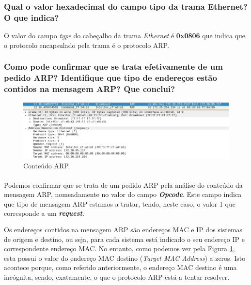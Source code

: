 \subsubsection{Qual o valor hexadecimal do campo tipo da trama Ethernet? O que indica?}

    \par O valor do campo \textit{type} do cabeçalho da trama \textit{Ethernet} é \textbf{0x0806} que indica que o protocolo encapsulado pela trama é o protocolo ARP.




\subsubsection{Como pode confirmar que se trata efetivamente de um pedido ARP? Identifique que tipo de endereços estão contidos na mensagem ARP? Que conclui?}

    \begin{figure}[H]
    \centering
    \includegraphics[width=500pt]{prints/Questao4/questao4-firstARP.png.png}
    \caption{Conteúdo ARP.} \label{questao4-ARPRequest-Extended}
    \end{figure}
    
    \paragraph{}
    \par Podemos confirmar que se trata de um pedido ARP pela análise do conteúdo da mensagem ARP, nomeadamente no valor do campo \textit{\textbf{Opcode}}. Este campo indica que tipo de mensagem ARP estamos a tratar, tendo, neste caso, o valor 1 que corresponde a um \textit{\textbf{request}}.
    
    \par Os endereços contidos na mensagem ARP são endereços MAC e IP dos sistemas de origem e destino, ou seja, para cada sistema está indicado o seu endereço IP e correspondente endereço MAC. No entanto, como podemos ver pela Figura \ref{questao4-ARPRequest-Extended}, esta possui o valor do endereço MAC destino (\textit{Target MAC Address}) a zeros. Isto acontece porque, como referido anteriormente, o endereço MAC destino é uma incógnita, sendo, exatamente, o que o protocolo  ARP está a tentar resolver.




